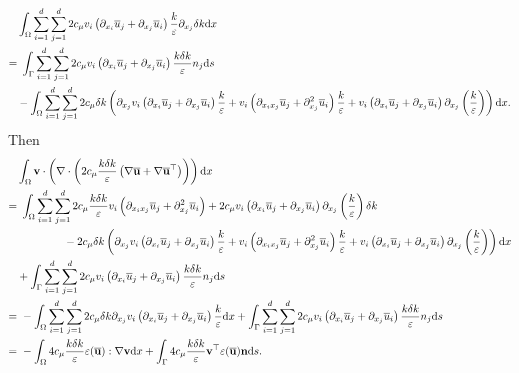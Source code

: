 \documentclass[oneside,11pt]{book}
\numberwithin{equation}{section}
\begin{document}
\begin{align*}
    &\int_\Omega \sum_{i=1}^d\sum_{j=1}^d 2c_\mu v_i\left(\partial_{x_i}\overline{u}_j + \partial_{x_j}\overline{u}_i\right)\frac{k}{\varepsilon}\partial_{x_j}\delta k{\rm d}x\\
    =&\ \int_\Gamma \sum_{i=1}^d\sum_{j=1}^d 2c_\mu v_i\left(\partial_{x_i}\overline{u}_j + \partial_{x_j}\overline{u}_i\right)\frac{k\delta k}{\varepsilon}n_j{\rm d}s\\
    &- \int_\Omega \sum_{i=1}^d\sum_{j=1}^d 2c_\mu\delta k\left(\partial_{x_j}v_i\left(\partial_{x_i}\overline{u}_j + \partial_{x_j}\overline{u}_i\right)\frac{k}{\varepsilon} + v_i\left(\partial_{x_ix_j}\overline{u}_j + \partial_{x_j}^2\overline{u}_i\right)\frac{k}{\varepsilon} + v_i\left(\partial_{x_i}\overline{u}_j + \partial_{x_j}\overline{u}_i\right)\partial_{x_j}\left(\frac{k}{\varepsilon}\right)\right){\rm d}x.
\end{align*}
Then
\begin{align*}
    &\int_\Omega {\bf v}\cdot\left(\nabla\cdot\left(2c_\mu\frac{k\delta k}{\varepsilon}\left(\nabla\overline{\bf u} + \nabla\overline{\bf u}^\top\right)\right)\right){\rm d}x\\
    =&\ \int_\Omega \sum_{i=1}^d\sum_{j=1}^d 2c_\mu\frac{k\delta k}{\varepsilon}v_i\left(\partial_{x_ix_j}\overline{u}_j + \partial_{x_j}^2\overline{u}_i\right) + 2c_\mu v_i\left(\partial_{x_i}\overline{u}_j + \partial_{x_j}\overline{u}_i\right)\partial_{x_j}\left(\frac{k}{\varepsilon}\right)\delta k\\
    &\hspace{1.5cm} - 2c_\mu\delta k\left(\partial_{x_j}v_i\left(\partial_{x_i}\overline{u}_j + \partial_{x_j}\overline{u}_i\right)\frac{k}{\varepsilon} + v_i\left(\partial_{x_ix_j}\overline{u}_j + \partial_{x_j}^2\overline{u}_i\right)\frac{k}{\varepsilon} + v_i\left(\partial_{x_i}\overline{u}_j +  \partial_{x_j}\overline{u}_i\right)\partial_{x_j}\left(\frac{k}{\varepsilon}\right)\right){\rm d}x\\
    &+\int_\Gamma \sum_{i=1}^d\sum_{j=1}^d 2c_\mu v_i\left(\partial_{x_i}\overline{u}_j + \partial_{x_j}\overline{u}_i\right)\frac{k\delta k}{\varepsilon}n_j{\rm d}s\\
    =&\ -\int_\Omega \sum_{i=1}^d\sum_{j=1}^d 2c_\mu\delta k\partial_{x_j}v_i\left(\partial_{x_i}\overline{u}_j + \partial_{x_j}\overline{u}_i\right)\frac{k}{\varepsilon}{\rm d}x + \int_\Gamma \sum_{i=1}^d\sum_{j=1}^d 2c_\mu v_i\left(\partial_{x_i}\overline{u}_j + \partial_{x_j}\overline{u}_i\right)\frac{k\delta k}{\varepsilon}n_j{\rm d}s\\
    =&\ -\int_\Omega 4c_\mu\frac{k\delta k}{\varepsilon}\varepsilon(\overline{\bf u}):\nabla{\bf v}{\rm d}x + \int_\Gamma 4c_\mu\frac{k\delta k}{\varepsilon}{\bf v}^\top\varepsilon(\overline{\bf u}){\bf n}{\rm d}s.
\end{align*}
\end{document}
